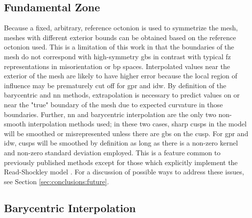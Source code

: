 \documentclass[preprint,12pt]{elsarticle}
\begin{document}
\subsection{Fundamental Zone}
Because a fixed, arbitrary, reference octonion is used to symmetrize the mesh, meshes with different exterior bounds can be obtained based on the reference octonion used. This is a limitation of this work in that the boundaries of the mesh do not correspond with high-symmetry \glspl{gb} in contrast with typical \gls{fz} representations in misorientation or \gls{bp} \cite{patalaSymmetriesRepresentationGrain2013,homerGrainBoundaryPlane2015} spaces. Interpolated values near the exterior of the mesh are likely to have higher error because the local region of influence may be prematurely cut off for \gls{gpr} and \gls{idw}. By definition of the barycentric and \gls{nn} methods, extrapolation is necessary to predict values on or near the "true" boundary of the mesh due to expected curvature in those boundaries. Further, \gls{nn} and barycentric interpolation are the only two non-smooth interpolation methods used; in these two cases, sharp cusps in the model will be smoothed or misrepresented unless there are \glspl{gb} on the cusp. For \gls{gpr} and \gls{idw}, cusps will be smoothed by definition as long as there is a non-zero kernel and non-zero standard deviation employed. This is a feature common to previously published methods \cite{liRelativeGrainBoundary2009,shenDeterminingGrainBoundary2019,chesserLearningGrainBoundary2020} except for those \cite{bulatovGrainBoundaryEnergy2014,shekhawatGeneralizedReadShockley2016} which explicitly implement the Read-Shockley model \cite{readDislocationModelsCrystal1950}. For a discussion of possible ways to address these issues, see Section \ref{sec:conclusions:future}.


\subsection{Barycentric Interpolation} \label{sec:methods:bary}
\end{document}
